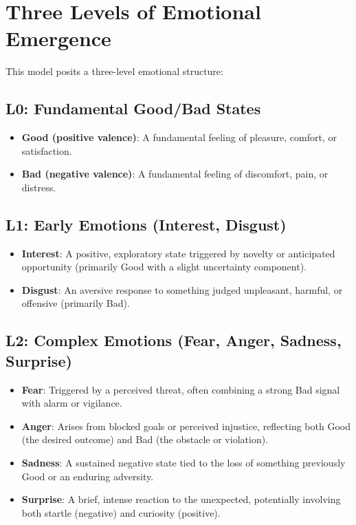 \documentclass[11pt]{article}
\begin{document}
\section{Three Levels of Emotional Emergence}
\label{sec:hierarchy}
This model posits a three-level emotional structure:

\subsection{L0: Fundamental Good/Bad States}
\begin{itemize}
    \item \textbf{Good (positive valence)}: A fundamental feeling of pleasure, comfort, or satisfaction.
    \item \textbf{Bad (negative valence)}: A fundamental feeling of discomfort, pain, or distress.
\end{itemize}

\subsection{L1: Early Emotions (Interest, Disgust)}
\begin{itemize}
    \item \textbf{Interest}: A positive, exploratory state triggered by novelty or anticipated opportunity (primarily Good with a slight uncertainty component).
    \item \textbf{Disgust}: An aversive response to something judged unpleasant, harmful, or offensive (primarily Bad).
\end{itemize}

\subsection{L2: Complex Emotions (Fear, Anger, Sadness, Surprise)}
\begin{itemize}
    \item \textbf{Fear}: Triggered by a perceived threat, often combining a strong Bad signal with alarm or vigilance.
    \item \textbf{Anger}: Arises from blocked goals or perceived injustice, reflecting both Good (the desired outcome) and Bad (the obstacle or violation).
    \item \textbf{Sadness}: A sustained negative state tied to the loss of something previously Good or an enduring adversity.
    \item \textbf{Surprise}: A brief, intense reaction to the unexpected, potentially involving both startle (negative) and curiosity (positive).
\end{itemize}
\end{document}
